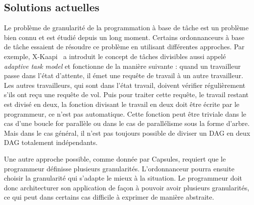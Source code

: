 \subsection{Solutions actuelles}
Le problème de granularité de la programmation à base de tâche est un problème bien connu et est étudié depuis un long moment.
%
Certains ordonnanceurs à base de tâche essaient de résoudre ce problème en utilisant différentes approches.
%
Par exemple, X-Kaapi~\cite{xkaapi} a introduit le concept de tâches divisibles aussi appelé {\em adaptive task model} et fonctionne de la manière suivante :
%
quand un travailleur passe dans l'état d'attente, il émet une requête de travail à un autre travailleur.
%
Les autres travailleurs, qui sont dans l'état travail, doivent vérifier régulièrement s'ils ont reçu une requête de vol.
%
Puis pour traiter cette requête, le travail restant est divisé en deux, la fonction divisant le travail en deux doit être écrite par le programmeur, ce n'est pas automatique.
%
Cette fonction peut être triviale dans le cas d'une boucle for parallèle ou dans le cas de parallélisme sous la forme d'arbre.
%
Mais dans le cas général, il n'est pas toujours possible de diviser un DAG en deux DAG totalement indépendants.


Une autre approche possible, comme donnée par Capsules\cite{capsules}, requiert que le programmeur définisse plusieurs granularités.
%
L'ordonnanceur pourra ensuite choisir la granularité qui s'adapte le mieux à la situation.
%
Le programmeur doit donc architecturer son application de façon à pouvoir avoir plusieurs granularités, ce qui peut dans certains cas difficile à exprimer de manière abstraite.
